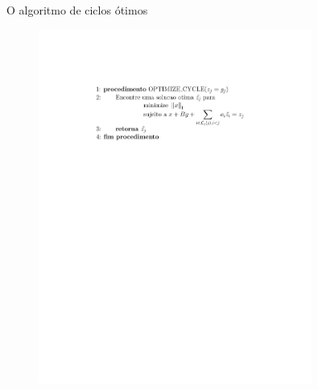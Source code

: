 \documentclass[10pt]{beamer}
\begin{document}
\begin{frame}{O algoritmo de ciclos ótimos}
\begin{figure}
    \centering
    \includegraphics[width=0.8\textwidth]{images/eqciclotimo.pdf}
\end{figure}

\end{frame}
\end{document}

